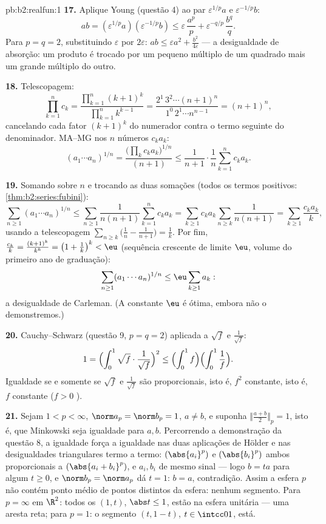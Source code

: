 \begin{solution}{pb:b2:realfun:1}
\textbf{17.} Aplique Young (questão 4) ao par
$\varepsilon^{1/p}a$ e $\varepsilon^{-1/p}b$:
\[
ab = (\varepsilon^{1/p}a)(\varepsilon^{-1/p}b)
\leq \varepsilon\,\frac{a^p}p +
\varepsilon^{-q/p}\,\frac{b^q}q .
\]
Para $p = q = 2$, substituindo $\varepsilon$ por $2\varepsilon$:
$ab \leq \varepsilon a^2 + \frac{b^2}{4\varepsilon}$ --- a
desigualdade de absorção: um produto é trocado por um pequeno múltiplo
de um quadrado mais um grande múltiplo do outro.

\textbf{18.} Telescopagem:
\[
\prod_{k=1}^{n}c_k = \frac{\prod_{k=1}^n(k+1)^k}
{\prod_{k=1}^{n}k^{k-1}}
= \frac{2^1\,3^2\cdots(n+1)^n}{1^0\,2^1\cdots n^{n-1}}
= (n+1)^n,
\]
cancelando cada fator $(k+1)^k$ do numerador contra o
termo seguinte do denominador. MA--MG nos $n$ números $c_ka_k$:
\[
(a_1\cdots a_n)^{1/n} =
\frac{\bigl(\prod_k c_ka_k\bigr)^{1/n}}{(n+1)}
\leq \frac{1}{n+1}\cdot\frac1n\sum_{k=1}^{n}c_ka_k .
\]

\textbf{19.} Somando sobre $n$ e trocando as duas somações
(todos os termos positivos: \cref{thm:b2:series:fubini}):
\[
\sum_{n\geq1}(a_1\cdots a_n)^{1/n}
\leq \sum_{n\geq1}\frac{1}{n(n+1)}\sum_{k=1}^{n}c_ka_k
= \sum_{k\geq1}c_ka_k\sum_{n\geq k}\frac1{n(n+1)}
= \sum_{k\geq1}\frac{c_ka_k}{k},
\]
usando a telescopagem $\sum_{n\geq k}\bigl(\frac1n -
\frac1{n+1}\bigr) = \frac1k$. Por fim, $\frac{c_k}k =
\frac{(k+1)^k}{k^k} = \bigl(1 + \frac1k\bigr)^k < \eu$
(sequência crescente de limite $\eu$, volume do primeiro ano de graduação):
\[
\sum_{n\geq1}(a_1\cdots a_n)^{1/n} \leq
\eu\sum_{k\geq1}a_k :
\]
a desigualdade de Carleman. (A constante $\eu$ é ótima, embora não o
demonstremos.)

\textbf{20.} Cauchy--Schwarz (questão 9, $p = q = 2$) aplicada
a $\sqrt f$ e $\frac1{\sqrt f}$:
\[
1 = \Bigl(\int_0^1\sqrt f\cdot\frac{1}{\sqrt f}\Bigr)^{2}
\leq \Bigl(\int_0^1 f\Bigr)\Bigl(\int_0^1\frac1f\Bigr).
\]
Igualdade se e somente se $\sqrt f$ e $\frac1{\sqrt f}$ são proporcionais,
isto é, $f^2$ constante, isto é, $f$ constante ($f > 0$ ).

\textbf{21.} Sejam $1 < p < \infty$, $\norm a_p = \norm b_p = 1$,
$a \neq b$, e suponha $\bigl\Vert\frac{a+b}2\bigr\Vert_p = 1$,
isto é, que Minkowski seja igualdade para $a, b$. Percorrendo a
demonstração da questão 8, a igualdade força a igualdade nas duas aplicações de Hölder
e nas desigualdades triangulares termo a termo: $(\abs{a_i}^p)$ e
$(\abs{b_i}^p)$ ambos proporcionais a $(\abs{a_i + b_i}^p)$, e
$a_i, b_i$ de mesmo sinal --- logo $b = ta$ para algum $t \geq
0$, e $\norm b_p = \norm a_p$ dá $t = 1$: $b = a$,
contradição. Assim a esfera $p$ não contém ponto médio de
pontos distintos da esfera: nenhum segmento. Para $p = \infty$ em $\R^2$:
todos os $(1, t)$, $\abs t \leq 1$, estão na esfera unitária --- uma
aresta reta; para $p = 1$: o segmento $(t, 1 - t)$, $t \in \intcc01$,
está.


\end{solution}
